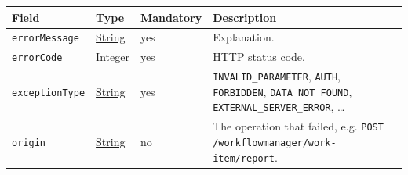 \documentclass[a4paper]{arrowhead}
\newcommand{\pref}[1]{{\textcolor{ArrowheadGrey}{\hyperref[sec:model:primitives:#1]{#1}}}}
\begin{document}
{\small
\begin{longtable}{|p{3.7cm}|p{4.2cm}|p{1.6cm}|p{6.3cm}|}

\hline
\rowcolor{gray!33} Field & Type & Mandatory & Description \\ \hline
\endhead
\texttt{errorMessage} & \pref{String} & yes & Explanation. \\ \hline
\texttt{errorCode} & \pref{Integer} & yes & HTTP status code. \\ \hline
\texttt{exceptionType} & \pref{String} & yes & \texttt{INVALID\_\allowbreak{}PARAMETER}, \texttt{AUTH}, \texttt{FORBIDDEN}, \texttt{DATA\_\allowbreak{}NOT\_\allowbreak{}FOUND}, \texttt{EXTERNAL\_\allowbreak{}SERVER\_\allowbreak{}ERROR}, \ldots \\ \hline
\texttt{origin} & \pref{String} & no & The operation that failed, e.g. \texttt{POST /\allowbreak{}workflowmanager/\allowbreak{}work-\allowbreak{}item/\allowbreak{}report}. \\ \hline
\end{longtable}
}
\end{document}
